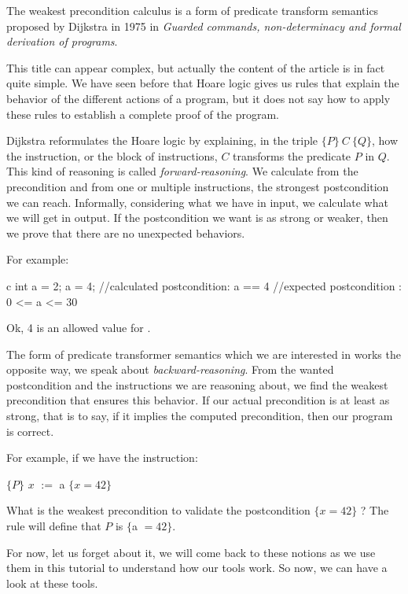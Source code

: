 

The weakest precondition calculus is a form of predicate transform
semantics proposed by Dijkstra in 1975 in \emph{Guarded commands,
non-determinacy and formal derivation of programs}.

This title can appear complex, but actually the content of the article is in
fact quite simple. We have seen before that Hoare logic gives us rules that
explain the behavior of the different actions of a program, but it does not say
how to apply these rules to establish a complete proof of the program.

Dijkstra reformulates the Hoare logic by explaining, in the triple
$\{P\}\ C\ \{Q\}$, how the instruction, or the block of instructions,
$C$ transforms the predicate $P$ in $Q$. This kind of reasoning is
called \emph{forward-reasoning}. We calculate from the precondition and
from one or multiple instructions, the strongest postcondition we can
reach. Informally, considering what we have in input, we calculate what
we will get in output. If the postcondition we want is as strong or
weaker, then we prove that there are no unexpected behaviors.



For example:



\begin{CodeBlock}{c}
int a = 2;
a = 4;
//calculated postcondition: a == 4
//expected postcondition  : 0 <= a <= 30
\end{CodeBlock}



Ok, 4 is an allowed value for .



The form of predicate transformer semantics which we are interested in
works the opposite way, we speak about \emph{backward-reasoning}. From
the wanted postcondition and the instructions we are reasoning about, we
find the weakest precondition that ensures this behavior. If our actual
precondition is at least as strong, that is to say, if it implies the
computed precondition, then our program is correct.



For example, if we have the instruction:



$\{P\}$ $x$ $:=$ a $\{x = 42\}$



What is the weakest precondition to validate the postcondition
$\{x = 42\}$ ? The rule will define that $P$ is $\{$a $=42\}$.



For now, let us forget about it, we will come back to these notions as
we use them in this tutorial to understand how our tools work. So now,
we can have a look at these tools.
